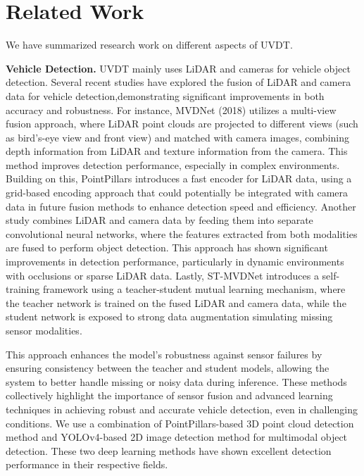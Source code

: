 \documentclass[lettersize,journal]{IEEEtran}
\begin{document}
\section{Related Work}

We have summarized research work on different aspects of UVDT.

\textbf{Vehicle Detection.}
UVDT mainly uses LiDAR and cameras for vehicle object detection.
Several recent studies have explored the fusion of LiDAR and camera data for vehicle detection,demonstrating significant improvements in both accuracy and robustness. 
For instance, MVDNet (2018) utilizes a multi-view fusion approach, where LiDAR point clouds are projected to different views (such as bird’s-eye view and front view) and matched with camera images, combining depth information from LiDAR and texture information from the camera. 
This method improves detection performance, especially in complex environments\cite{Alpher22h}. 
Building on this, PointPillars introduces a fast encoder for LiDAR data, using a grid-based encoding approach that could potentially be integrated with camera data in future fusion methods to enhance detection speed and efficiency\cite{Alpher19}.
Another study combines LiDAR and camera data by feeding them into separate convolutional neural networks, where the features extracted from both modalities are fused to perform object detection\cite{Alpher20e}. 
This approach has shown significant improvements in detection performance, particularly in dynamic environments with occlusions or sparse LiDAR data.
Lastly, ST-MVDNet introduces a self-training framework using a teacher-student mutual learning mechanism, where the teacher network is trained on the fused LiDAR and camera data, while the student network is exposed to strong data augmentation simulating missing sensor modalities\cite{Alpher22f}. 

This approach enhances the model’s robustness against sensor failures by ensuring consistency between the teacher and student models, allowing the system to better handle missing or noisy data during inference.
These methods collectively highlight the importance of sensor fusion and advanced learning techniques in achieving robust and accurate vehicle detection, even in challenging conditions.
We use a combination of PointPillars-based 3D point cloud detection method and YOLOv4-based 2D image detection method for multimodal object detection.
These two deep learning methods have shown excellent detection performance in their respective fields.
\end{document}
